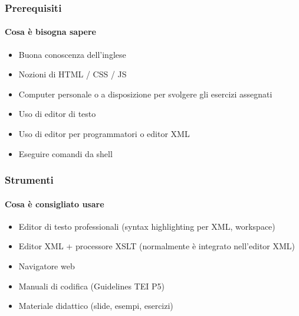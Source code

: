 


\begin{frame}
	\frametitle{Prerequisiti}
	\framesubtitle{Cosa è bisogna sapere}
	\addtocounter{nframe}{1}

	\begin{itemize}
		\item Buona conoscenza dell’inglese
		\item Nozioni di HTML / CSS / JS
		\item Computer personale o a disposizione per svolgere gli esercizi assegnati
		\item Uso di editor di testo
		\item Uso di editor per programmatori o editor XML
		\item Eseguire comandi da shell
	\end{itemize}

\end{frame}

\begin{frame}
	\frametitle{Strumenti}
	\framesubtitle{Cosa è consigliato usare}
	\addtocounter{nframe}{1}

	\begin{itemize}
		\item Editor di testo professionali (syntax highlighting per XML, workspace)
		\item Editor XML + processore XSLT (normalmente è integrato
		      nell’editor XML)
		\item Navigatore web
		\item Manuali di codifica (Guidelines TEI P5)
		\item Materiale didattico (slide, esempi, esercizi)
	\end{itemize}

\end{frame}

